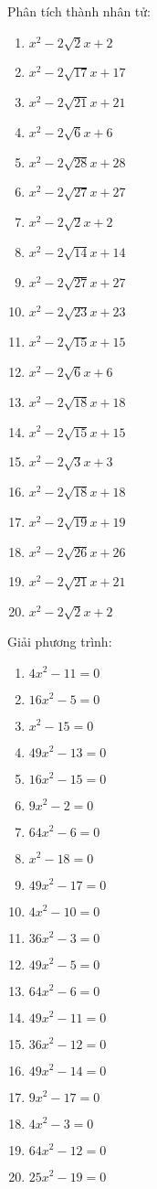 \documentclass[12pt,a4paper]{article}
\begin{document}
\begin{ex}
	Phân tích thành nhân tử:
	\begin{enumerate}
		\item ${x^2 - 2\sqrt{2}x+2}$
		\item ${x^2 - 2\sqrt{17}x+17}$
		\item ${x^2 - 2\sqrt{21}x+21}$
		\item ${x^2 - 2\sqrt{6}x+6}$
		\item ${x^2 - 2\sqrt{28}x+28}$
		\item ${x^2 - 2\sqrt{27}x+27}$
		\item ${x^2 - 2\sqrt{2}x+2}$
		\item ${x^2 - 2\sqrt{14}x+14}$
		\item ${x^2 - 2\sqrt{27}x+27}$
		\item ${x^2 - 2\sqrt{23}x+23}$
		\item ${x^2 - 2\sqrt{15}x+15}$
		\item ${x^2 - 2\sqrt{6}x+6}$
		\item ${x^2 - 2\sqrt{18}x+18}$
		\item ${x^2 - 2\sqrt{15}x+15}$
		\item ${x^2 - 2\sqrt{3}x+3}$
		\item ${x^2 - 2\sqrt{18}x+18}$
		\item ${x^2 - 2\sqrt{19}x+19}$
		\item ${x^2 - 2\sqrt{26}x+26}$
		\item ${x^2 - 2\sqrt{21}x+21}$
		\item ${x^2 - 2\sqrt{2}x+2}$
	\end{enumerate}
\end{ex}



\begin{ex}
	Giải phương trình:
	\begin{enumerate}
		\item ${4x^2 - 11}=0$
		\item ${16x^2 - 5}=0$
		\item ${x^2 - 15}=0$
		\item ${49x^2 - 13}=0$
		\item ${16x^2 - 15}=0$
		\item ${9x^2 - 2}=0$
		\item ${64x^2 - 6}=0$
		\item ${x^2 - 18}=0$
		\item ${49x^2 - 17}=0$
		\item ${4x^2 - 10}=0$
		\item ${36x^2 - 3}=0$
		\item ${49x^2 - 5}=0$
		\item ${64x^2 - 6}=0$
		\item ${49x^2 - 11}=0$
		\item ${36x^2 - 12}=0$
		\item ${49x^2 - 14}=0$
		\item ${9x^2 - 17}=0$
		\item ${4x^2 - 3}=0$
		\item ${64x^2 - 12}=0$
		\item ${25x^2 - 19}=0$
	\end{enumerate}
\end{ex}
\end{document}
